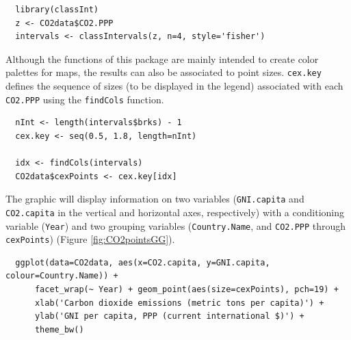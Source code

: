 \documentclass[smallroyalvopaper]{memoir}
\begin{document}
\lstset{language=r,label= ,caption= ,captionpos=b,numbers=none}
\begin{lstlisting}
  library(classInt)
  z <- CO2data$CO2.PPP
  intervals <- classIntervals(z, n=4, style='fisher')
\end{lstlisting}

Although the functions of this package are mainly intended to create color palettes for maps, the results can also be associated to point sizes. \texttt{cex.key} defines the sequence of sizes (to be displayed in the legend) associated with each \texttt{CO2.PPP} using the \texttt{findCols} function.
\lstset{language=r,label= ,caption= ,captionpos=b,numbers=none}
\begin{lstlisting}
  nInt <- length(intervals$brks) - 1
  cex.key <- seq(0.5, 1.8, length=nInt)
  
  idx <- findCols(intervals)
  CO2data$cexPoints <- cex.key[idx]
\end{lstlisting}

The graphic will display information on two variables (\texttt{GNI.capita} and \texttt{CO2.capita} in the vertical and horizontal axes, respectively) with a conditioning variable (\texttt{Year}) and two grouping variables (\texttt{Country.Name}, and \texttt{CO2.PPP} through \texttt{cexPoints}) (Figure \ref{fig:CO2pointsGG}).

\lstset{language=r,label= ,caption= ,captionpos=b,numbers=none}
\begin{lstlisting}
  ggplot(data=CO2data, aes(x=CO2.capita, y=GNI.capita, colour=Country.Name)) +
      facet_wrap(~ Year) + geom_point(aes(size=cexPoints), pch=19) +
      xlab('Carbon dioxide emissions (metric tons per capita)') +
      ylab('GNI per capita, PPP (current international $)') +
      theme_bw()
\end{lstlisting}
\end{document}
